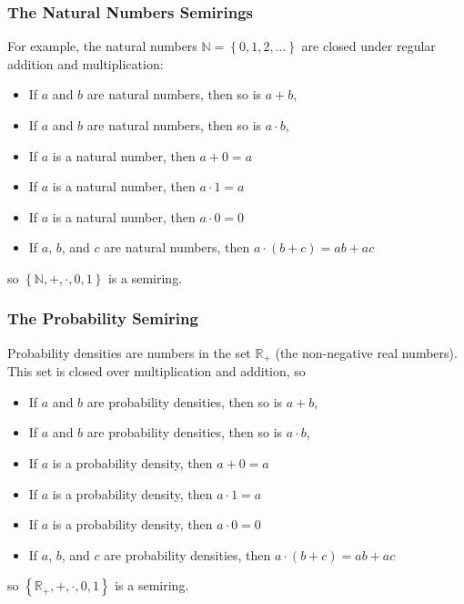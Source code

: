\begin{frame}
  \frametitle{The Natural Numbers Semirings}

  For example, the natural numbers
  $\mathbb{N}=\left\{0,1,2,\ldots\right\}$ are closed under regular
  addition and multiplication:
  \begin{itemize}
  \item If $a$ and $b$ are natural numbers, then so is $a+b$,
  \item If $a$ and $b$ are natural numbers, then so is $a\cdot b$,
  \item If $a$ is a natural number, then $a+0=a$
  \item If $a$ is a natural number, then $a\cdot 1=a$
  \item If $a$ is a natural number, then $a\cdot 0=0$
  \item If $a$, $b$, and $c$ are natural numbers, then $a\cdot (b+c) = ab+ac$
  \end{itemize}
  so $\left\{\mathbb{N},+,\cdot,0,1\right\}$ is a semiring.
\end{frame}

\begin{frame}
  \frametitle{The Probability Semiring}

  Probability densities are numbers in the set $\mathbb{R}_+$ (the
  non-negative real numbers).  This set is closed over multiplication
  and addition, so
  \begin{itemize}
  \item If $a$ and $b$ are probability densities, then so is $a+b$,
  \item If $a$ and $b$ are probability densities, then so is $a\cdot b$,
  \item If $a$ is a probability density, then $a+0=a$
  \item If $a$ is a probability density, then $a\cdot 1=a$
  \item If $a$ is a probability density, then $a\cdot 0=0$
  \item If $a$, $b$, and $c$ are probability densities, then $a\cdot (b+c) = ab+ac$
  \end{itemize}
  so $\left\{\mathbb{R}_+,+,\cdot,0,1\right\}$ is a semiring.
\end{frame}

